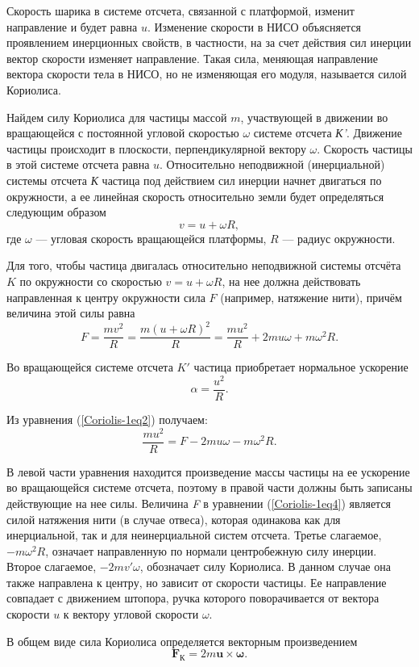 \documentclass[14pt,a4paper,oneside]{extarticle}	%
\begin{document}
	Скорость шарика в системе отсчета, связанной с платформой, изменит направление и будет равна $ u $. Изменение скорости в НИСО объясняется проявлением инерционных свойств, в частности, на за счет действия сил инерции вектор скорости изменяет направление.
	Такая сила, меняющая направление вектора скорости тела в НИСО, но не изменяющая его модуля, называется силой Кориолиса.
	
	Найдем силу Кориолиса для частицы массой $ m $, участвующей в движении во вращающейся с постоянной угловой скоростью $ \omega $ системе отсчета \textit{ К'}.
	Движение частицы происходит в плоскости, перпендикулярной вектору $ \omega $.
	Скорость частицы в этой системе отсчета равна $ u $.
	Относительно неподвижной (инерциальной) системы отсчета \textit{К} частица под действием сил инерции начнет двигаться по окружности, а ее линейная скорость относительно земли будет определяться следующим образом
	\begin{equation}\label{Coriolis-1eq1}
	v = u + \omega R,
	\end{equation}
	где $ \omega $ — угловая скорость вращающейся платформы, $ R $ — радиус окружности.
	
	Для того, чтобы частица двигалась относительно неподвижной системы отсчёта $ K $ по окружности со скоростью $ v = u + \omega R $, на нее должна действовать направленная к центру окружности сила $ F $ (например, натяжение нити), причём величина этой силы равна
	\begin{equation}\label{Coriolis-1eq2}
	F = \frac{mv^{2}}{R} = \frac{m( u + \omega R)^{2} }{R} = \frac{mu^{2}}{R} + 2mu\omega + m \omega^{2}R.
	\end{equation}
	
	Во вращающейся системе отсчета $ K' $ частица приобретает нормальное ускорение
	\begin{equation}\label{Coriolis-1eq3}
	\alpha = \frac{u^{2}}{R}.
	\end{equation}
	
	Из уравнения (\ref{Coriolis-1eq2}) получаем:
	\begin{equation}\label{Coriolis-1eq4}
	  \frac{mu^{2}}{R} = F - 2mu\omega - m \omega^{2}R.	
	\end{equation}
	
	В левой части уравнения находится произведение массы частицы на ее ускорение во вращающейся системе отсчета, поэтому в правой части должны быть записаны действующие на нее силы.
	Величина \textit{F} в уравнении (\ref{Coriolis-1eq4}) является силой натяжения нити (в случае отвеса), которая одинакова как для инерциальной, так и для неинерциальной систем отсчета. 
	Третье слагаемое, $ - m \omega^{2}R $, означает направленную по нормали центробежную силу инерции. 
	Второе слагаемое, $ - 2mv'\omega $, обозначает силу Кориолиса. 
	В данном случае она также направлена к центру, но зависит от скорости частицы.
	Ее направление совпадает с движением штопора, ручка которого поворачивается от вектора скорости $ u $ к вектору угловой скорости $ \omega $.
	
	В общем виде сила Кориолиса определяется векторным произведением
	\begin{equation}\label{Coriolis-1eq5}
	\textbf{F}_{\text{К}} = 2m\textbf{u}\times\textbf{ω}.	
	\end{equation}	
	
\end{document}
